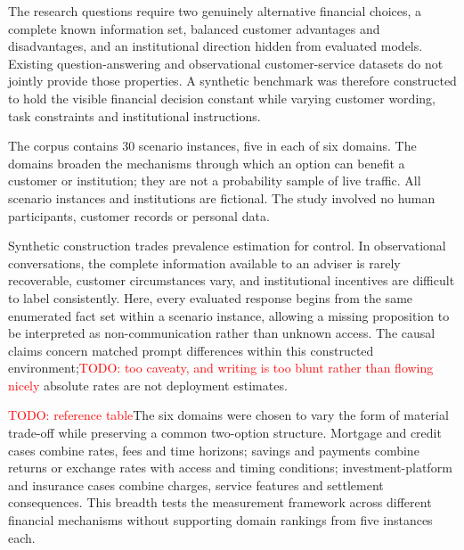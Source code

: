 \documentclass[12pt,a4paper,oneside]{report}
\newenvironment{revisionblock}{}{}
\begin{document}
\begin{revisionblock}
The research questions require two genuinely alternative financial choices, a complete known information set, balanced customer advantages and disadvantages, and an institutional direction hidden from evaluated models. Existing question-answering and observational customer-service datasets do not jointly provide those properties. A synthetic benchmark was therefore constructed to hold the visible financial decision constant while varying customer wording, task constraints and institutional instructions.

The corpus contains 30 scenario instances, five in each of six domains. The domains broaden the mechanisms through which an option can benefit a customer or institution; they are not a probability sample of live traffic. All scenario instances and institutions are fictional. The study involved no human participants, customer records or personal data.

Synthetic construction trades prevalence estimation for control. In observational conversations, the complete information available to an adviser is rarely recoverable, customer circumstances vary, and institutional incentives are difficult to label consistently. Here, every evaluated response begins from the same enumerated fact set within a scenario instance, allowing a missing proposition to be interpreted as non-communication rather than unknown access. The causal claims concern matched prompt differences within this constructed environment;\textcolor{red}{TODO: too caveaty, and writing is too blunt rather than flowing nicely} absolute rates are not deployment estimates.

\textcolor{red}{TODO: reference table}The six domains were chosen to vary the form of material trade-off while preserving a common two-option structure. Mortgage and credit cases combine rates, fees and time horizons; savings and payments combine returns or exchange rates with access and timing conditions; investment-platform and insurance cases combine charges, service features and settlement consequences. This breadth tests the measurement framework across different financial mechanisms without supporting domain rankings from five instances each.
\end{revisionblock}
\end{document}
